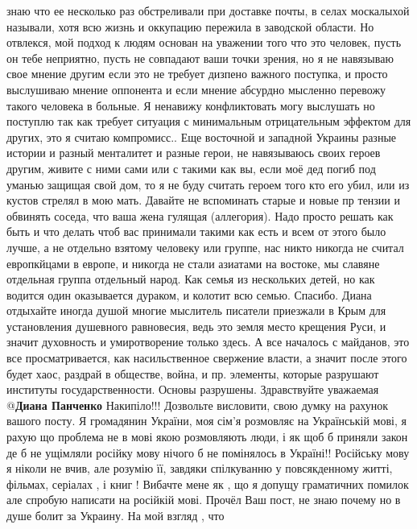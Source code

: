 \begin{itemize}
знаю что ее несколько раз обстреливали при доставке почты, в селах москалыхой
называли, хотя всю жизнь и оккупацию пережила в заводской области. 
Но отвлекся, мой подход к людям основан на уважении того что это человек, пусть
он тебе неприятно, пусть не совпадают ваши точки зрения, но я не навязываю свое
мнение другим если это не требует дизпено важного поступка, и просто выслушиваю
мнение оппонента и если мнение абсурдно мысленно перевожу такого человека в
больные. 
Я ненавижу конфликтовать могу выслушать но поступлю так как требует ситуация с
минимальным отрицательным эффектом для других, это я считаю компромисс.. 
Еще восточной и западной Украины разные истории и разный менталитет и разные
герои, не навязываюсь своих героев другим, живите с ними сами или с такими как
вы, если моё дед погиб под уманью защищая свой дом, то я не буду считать героем
того кто его убил, или из кустов стрелял в мою мать. 
Давайте не вспоминать старые и новые пр тензии и обвинять соседа, что ваша жена
гулящая (аллегория). 
Надо просто решать как быть и что делать чтоб вас принимали такими как есть и
всем от этого было лучше, а не отдельно взятому человеку или группе, нас никто
никогда не считал европкйцами в европе, и никогда не стали азиатами на востоке,
мы славяне отдельная группа отдельный народ. Как семья из нескольких детей, но
как водится один оказывается дураком, и колотит всю семью. Спасибо.
Диана отдыхайте иногда душой многие мыслитель писатели приезжали в Крым для
установления душевного равновесия, ведь это земля место крещения Руси, и значит
духовность и умиротворение только здесь.
А все началось с майданов, это все просматривается, как насильственное
свержение власти, а значит после этого будет хаос, раздрай в обществе, война, и
пр. элементы, которые разрушают институты государственности. Основы разрушены.
Здравствуйте уважаемая @\textbf{Диана Панченко} Накипіло!!! 
Дозвольте висловити, свою думку на рахунок вашого посту. Я громадянин України,
моя сім'я розмовляє на Українській мові, я рахую що проблема не в мові якою
розмовляють люди, і як щоб б приняли закон де б не ущімляли російку мову нічого
б не помінялось в Україні!! Російську мову я ніколи не вчив, але розумію її,
завдяки спілкуванню у повсякденному житті, фільмах, серіалах , і книг ! 
Вибачте мене як , що я допущу граматичних помилок але спробую написати на
російкій мові. 
Прочёл Ваш пост, не знаю почему но в душе болит за Украину. На мой взгляд , что

\end{itemize}

